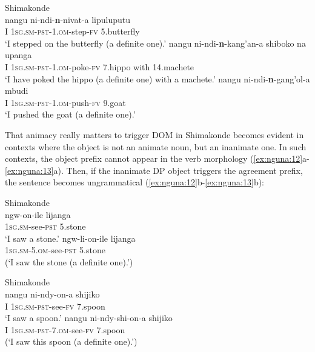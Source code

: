 \documentclass[output=paper]{langsci/langscibook}
\begin{document}
\ea\label{ex:nguna:11}
{Shimakonde}\\
\ea
\gll nangu        ni-ndi-\textbf{n}-nivat-a                           lipuluputu\\
     I                \textsc{1sg.sm-pst-1.om}-step-\textsc{fv}            5.butterfly\\
\glt ‘I stepped on the butterfly (a definite one).’
\ex\label{ex:nguna:}
\gll nangu         ni-ndi-\textbf{n}-kang'an-a                     shiboko           na       upanga\\
     I                 \textsc{1sg.sm-pst-1.om}-poke-\textsc{fv}         7.hippo            with   14.machete\\
\glt ‘I have poked the hippo (a definite one) with a machete.’
\ex\label{ex:nguna:}
\gll nangu         ni-ndi-\textbf{n}-gang'ol-a                      mbudi\\
     I                 \textsc{1sg.sm-pst-1.om}-push-\textsc{fv}          9.goat\\
\glt ‘I pushed the goat (a definite one).’
\z
\z

{That animacy really matters to trigger DOM in Shimakonde becomes evident in contexts where the object is not an animate noun, but an inanimate one. In such contexts, the object prefix cannot appear in the verb morphology (\ref{ex:nguna:12}a-\ref{ex:nguna:13}a). Then, if the inanimate DP object triggers the agreement prefix, the sentence becomes ungrammatical (\ref{ex:nguna:12}b-\ref{ex:nguna:13}b):}


\ea\label{ex:nguna:12}
{Shimakonde}\\
\ea
\gll ngw-on-ile                     lijanga\\
     \textsc{1sg.sm}-see-\textsc{pst}             5.stone\\
\glt ‘I saw a stone.’
\ex\label{ex:nguna:}
\gll *ngw-li-on-ile                        lijanga\\
     \textsc{1sg.sm-5.om}-see-\textsc{pst}            5.stone\\
\glt (‘I saw the stone (a definite one).’)
\z
\z


\ea\label{ex:nguna:13}
{Shimakonde}\\
\ea
\gll nangu       ni-ndy-on-a                   shijiko\\
     I               \textsc{1sg.sm-pst}-see-\textsc{fv}        7.spoon\\
\glt ‘I saw a spoon.’
\ex\label{ex:nguna:13b}
\gll *nangu      ni-ndy-shi-on-a                      shijiko\\
     I                \textsc{1sg.sm-pst-7.om}-see-\textsc{fv}        7.spoon\\
\glt (‘I saw this spoon (a definite one).’)
\z
\z
\end{document}
